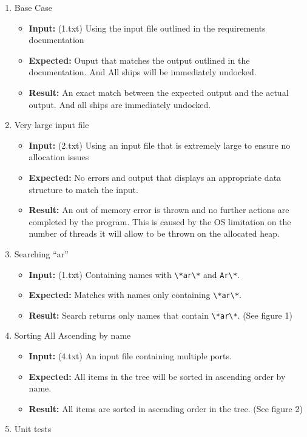 \documentclass[english,floatsintext,man]{apa6}
\providecommand{\tightlist}{%
  \setlength{\itemsep}{0pt}\setlength{\parskip}{0pt}}
\begin{document}
\begin{enumerate}
\def\labelenumi{\arabic{enumi}.}
\tightlist
\item
  Base Case

  \begin{itemize}
  \tightlist
  \item
    \textbf{Input:} (1.txt) Using the input file outlined in the
    requirements documentation
  \item
    \textbf{Expected:} Ouput that matches the output outlined in the
    documentation. And All ships will be immediately undocked.
  \item
    \textbf{Result:} An exact match between the expected output and the
    actual output. And all ships are immediately undocked.
  \end{itemize}
\item
  Very large input file

  \begin{itemize}
  \tightlist
  \item
    \textbf{Input:} (2.txt) Using an input file that is extremely large
    to ensure no allocation issues
  \item
    \textbf{Expected:} No errors and output that displays an appropriate
    data structure to match the input.
  \item
    \textbf{Result:} An out of memory error is thrown and no further
    actions are completed by the program. This is caused by the OS
    limitation on the number of threads it will allow to be thrown on
    the allocated heap.
  \end{itemize}
\item
  Searching \enquote{ar}

  \begin{itemize}
  \tightlist
  \item
    \textbf{Input:} (1.txt) Containing names with
    \texttt{\textbackslash{}*ar\textbackslash{}*} and
    \texttt{Ar\textbackslash{}*}.
  \item
    \textbf{Expected:} Matches with names only containing
    \texttt{\textbackslash{}*ar\textbackslash{}*}.
  \item
    \textbf{Result:} Search returns only names that contain
    \texttt{\textbackslash{}*ar\textbackslash{}*}. (See figure 1)
  \end{itemize}
\item
  Sorting All Ascending by name

  \begin{itemize}
  \tightlist
  \item
    \textbf{Input:} (4.txt) An input file containing multiple ports.
  \item
    \textbf{Expected:} All items in the tree will be sorted in ascending
    order by name.
  \item
    \textbf{Result:} All items are sorted in ascending order in the
    tree. (See figure 2)
  \end{itemize}
\item
  Unit tests


\end{enumerate}
\end{document}
